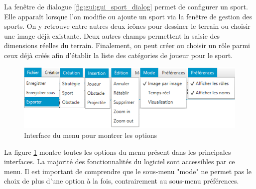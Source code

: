 La fenêtre de dialogue \ref{fig:gui:gui_sport_dialog} permet de configurer un sport.
Elle apparaît lorsque l'on modifie ou ajoute un sport via la fenêtre de gestion des sports.
On y retrouve entre autres deux icônes pour dessiner le terrain ou choisir une image déjà existante.
Deux autres champs permettent la saisie des dimensions réelles du terrain.
Finalement, on peut créer ou choisir un rôle parmi ceux déjà créés afin d'établir la liste des catégories de joueur pour le sport.

\newpage

\begin{figure}[htpb]
    \centering
    \includegraphics[scale=0.7]{fig/gui/gui_menu.png}
    \caption{Interface du menu pour montrer les options}
    \label{fig:gui:gui_menu}
\end{figure}

La figure \ref{fig:gui:gui_menu} montre toutes les options du menu présent dans les principales interfaces.
La majorité des fonctionnalités du logiciel sont accessibles par ce menu.
Il est important de comprendre que le sous-menu "mode" ne permet pas le choix de plus d'une option à la fois, contrairement au sous-menu préférences.
